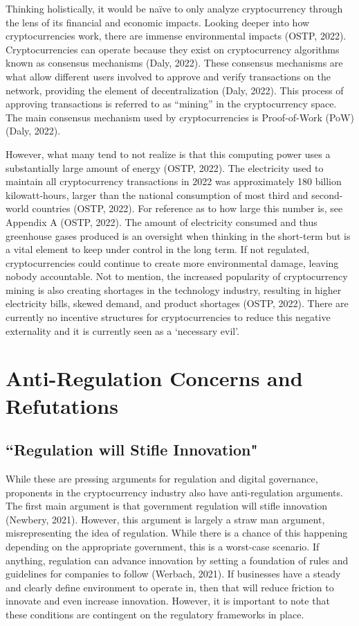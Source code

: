 \documentclass{article}
\begin{document}
\noindent Thinking holistically, it would be naïve to only analyze cryptocurrency through the lens of its financial and economic impacts. Looking deeper into how cryptocurrencies work, there are immense environmental impacts (OSTP, 2022). Cryptocurrencies can operate because they exist on cryptocurrency algorithms known as consensus mechanisms (Daly, 2022). These consensus mechanisms are what allow different users involved to approve and verify transactions on the network, providing the element of decentralization (Daly, 2022). This process of approving transactions is referred to as “mining” in the cryptocurrency space. The main consensus mechanism used by cryptocurrencies is Proof-of-Work (PoW) (Daly, 2022).

\noindent \newline However, what many tend to not realize is that this computing power uses a substantially large amount of energy (OSTP, 2022). The electricity used to maintain all cryptocurrency transactions in 2022 was approximately 180 billion kilowatt-hours, larger than the national consumption of most third and second-world countries (OSTP, 2022). For reference as to how large this number is, see Appendix A (OSTP, 2022). The amount of electricity consumed and thus greenhouse gases produced is an oversight when thinking in the short-term but is a vital element to keep under control in the long term. If not regulated, cryptocurrencies could continue to create more environmental damage, leaving nobody accountable. Not to mention, the increased popularity of cryptocurrency mining is also creating shortages in the technology industry, resulting in higher electricity bills, skewed demand, and product shortages (OSTP, 2022). There are currently no incentive structures for cryptocurrencies to reduce this negative externality and it is currently seen as a ‘necessary evil’.

\section{Anti-Regulation Concerns and Refutations}
\subsection{``Regulation will Stifle Innovation"}

\noindent While these are pressing arguments for regulation and digital governance, proponents in the cryptocurrency industry also have anti-regulation arguments. The first main argument is that government regulation will stifle innovation (Newbery, 2021). However, this argument is largely a straw man argument, misrepresenting the idea of regulation. While there is a chance of this happening depending on the appropriate government, this is a worst-case scenario. If anything, regulation can advance innovation by setting a foundation of rules and guidelines for companies to follow (Werbach, 2021). If businesses have a steady and clearly define environment to operate in, then that will reduce friction to innovate and even increase innovation. However, it is important to note that these conditions are contingent on the regulatory frameworks in place.
\end{document}
